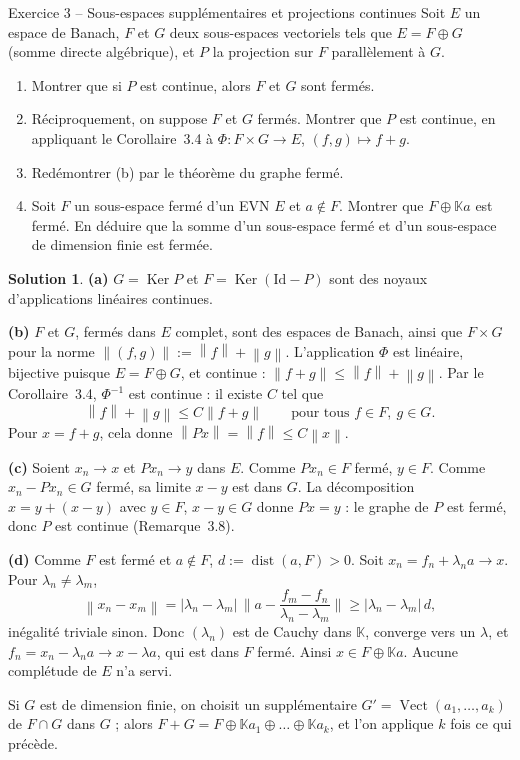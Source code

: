 \documentclass[11pt,a4paper]{article}
\newcommand{\K}{\mathbb{K}}
\newcommand{\dist}{\operatorname{dist}}
\newcommand{\Vect}{\operatorname{Vect}}
\newcommand{\norm}[1]{\left\|#1\right\|}
\DeclareMathOperator{\Ker}{Ker}
\theoremstyle{definition}
\newtheorem*{solution}{Solution}
\begin{document}
\begin{exo}{Exercice 3 -- Sous-espaces supplémentaires et projections continues}
Soit $E$ un espace de Banach, $F$ et $G$ deux sous-espaces vectoriels tels que $E=F\oplus G$ (somme directe algébrique), et $P$ la projection sur $F$ parallèlement à $G$.
\begin{enumerate}[label=(\alph*)]
  \item Montrer que si $P$ est continue, alors $F$ et $G$ sont fermés.
  \item Réciproquement, on suppose $F$ et $G$ fermés. Montrer que $P$ est continue, en appliquant le Corollaire~3.4 à $\Phi:F\times G\to E$, $(f,g)\mapsto f+g$.
  \item Redémontrer (b) par le théorème du graphe fermé.
  \item Soit $F$ un sous-espace fermé d'un EVN $E$ et $a\notin F$. Montrer que $F\oplus\K a$ est fermé. En déduire que la somme d'un sous-espace fermé et d'un sous-espace de dimension finie est fermée.
\end{enumerate}
\end{exo}

\begin{solution}
\noindent\textbf{(a)} $G=\Ker P$ et $F=\Ker(\mathrm{Id}-P)$ sont des noyaux d'applications linéaires continues.

\medskip
\noindent\textbf{(b)} $F$ et $G$, fermés dans $E$ complet, sont des espaces de Banach, ainsi que $F\times G$ pour la norme $\norm{(f,g)}:=\norm f+\norm g$. L'application $\Phi$ est linéaire, bijective puisque $E=F\oplus G$, et continue : $\norm{f+g}\le\norm f+\norm g$. Par le Corollaire~3.4, $\Phi^{-1}$ est continue : il existe $C$ tel que
\[
\norm f+\norm g\le C\norm{f+g}\qquad\text{pour tous }f\in F,\ g\in G .
\]
Pour $x=f+g$, cela donne $\norm{Px}=\norm f\le C\norm x$.

\medskip
\noindent\textbf{(c)} Soient $x_n\to x$ et $Px_n\to y$ dans $E$. Comme $Px_n\in F$ fermé, $y\in F$. Comme $x_n-Px_n\in G$ fermé, sa limite $x-y$ est dans $G$. La décomposition $x=y+(x-y)$ avec $y\in F$, $x-y\in G$ donne $Px=y$ : le graphe de $P$ est fermé, donc $P$ est continue (Remarque~3.8).

\medskip
\noindent\textbf{(d)} Comme $F$ est fermé et $a\notin F$, $d:=\dist(a,F)>0$. Soit $x_n=f_n+\lambda_na\to x$. Pour $\lambda_n\ne\lambda_m$,
\[
\norm{x_n-x_m}=|\lambda_n-\lambda_m|\,\Big\|a-\frac{f_m-f_n}{\lambda_n-\lambda_m}\Big\|\ge|\lambda_n-\lambda_m|\,d,
\]
inégalité triviale sinon. Donc $(\lambda_n)$ est de Cauchy dans $\K$, converge vers un $\lambda$, et $f_n=x_n-\lambda_na\to x-\lambda a$, qui est dans $F$ fermé. Ainsi $x\in F\oplus\K a$. Aucune complétude de $E$ n'a servi.

Si $G$ est de dimension finie, on choisit un supplémentaire $G'=\Vect(a_1,\dots,a_k)$ de $F\cap G$ dans $G$ ; alors $F+G=F\oplus\K a_1\oplus\dots\oplus\K a_k$, et l'on applique $k$ fois ce qui précède.
\end{solution}
\end{document}
